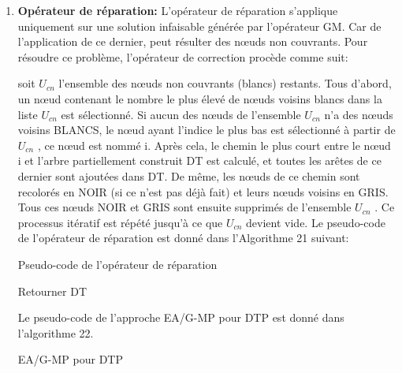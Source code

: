 \begin{enumerate}[label=\alph*)]
\item \textbf{Opérateur de réparation:}
L’opérateur de réparation s’applique uniquement sur une solution infaisable générée par l’opérateur GM. Car de l'application de ce dernier, peut résulter des nœuds non couvrants. Pour résoudre ce problème,  l’opérateur de correction procède comme suit:
  
soit $U_{cn}$ l’ensemble des nœuds non couvrants (blancs) restants. Tous d’abord, un nœud contenant le nombre  le plus élevé de nœuds voisins blancs dans la liste $U_{cn}$ est sélectionné. Si aucun des nœuds de l’ensemble $U_{cn}$ n’a des nœuds voisins BLANCS, le nœud ayant l’indice le plus bas est sélectionné à partir de $U_{cn}$ , ce nœud est nommé i. Après cela, le chemin le plus court entre le nœud i et l’arbre partiellement construit DT est calculé, et toutes les arêtes de ce dernier sont ajoutées dans DT. De même, les nœuds de ce chemin sont recolorés en NOIR (si ce n’est pas déjà fait) et leurs nœuds voisins en GRIS. Tous ces nœuds NOIR et GRIS sont ensuite supprimés de l’ensemble $U_{cn}$ . Ce processus itératif  est répété jusqu’à ce que $U_{cn}$ devient vide. Le pseudo-code de l’opérateur de réparation est donné dans l’Algorithme 21 suivant: \\

\begin{algorithm}[H]
\label{alg3:PCOR}
\caption{Pseudo-code de l’opérateur de réparation}
\SetAlgoLined
\DontPrintSemicolon
\large



Retourner DT \;

\end{algorithm}


Le pseudo-code de l’approche EA/G-MP pour DTP est donné dans l'algorithme 22.\\

\begin{algorithm}[H]
\label{alg3:EAMPDTP}
\caption{EA/G-MP pour DTP}
\SetAlgoLined
\DontPrintSemicolon
\large


\end{algorithm}
\end{enumerate}
